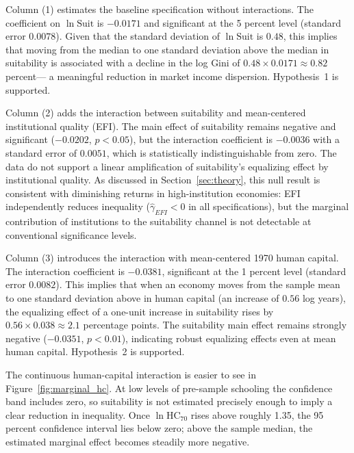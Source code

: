 \documentclass[12pt]{article}
\newcommand{\suit}{\mathrm{Suit}}
\newcommand{\hc}{\mathrm{HC}}
\begin{document}
Column (1) estimates the baseline specification without
interactions.
The coefficient on $\ln \suit$ is $-0.0171$ and significant at the
5 percent level (standard error $0.0078$).
Given that the standard deviation of $\ln \suit$ is $0.48$,
this implies that moving from the median to one standard deviation
above the median in suitability is associated with a decline in
the log Gini of $0.48 \times 0.0171 \approx 0.82$ percent---
a meaningful reduction in market income dispersion.
Hypothesis~1 is supported.

Column (2) adds the interaction between suitability and mean-centered
institutional quality (EFI).
The main effect of suitability remains negative and significant
($-0.0202$, $p < 0.05$), but the interaction coefficient is
$-0.0036$ with a standard error of $0.0051$, which is
statistically indistinguishable from zero.
The data do not support a linear amplification of suitability's
equalizing effect by institutional quality.
As discussed in Section~\ref{sec:theory}, this null result is
consistent with diminishing returns in high-institution economies:
EFI independently reduces inequality ($\hat{\gamma}_{EFI} < 0$
in all specifications), but the marginal contribution of institutions
to the suitability channel is not detectable at conventional
significance levels.

Column (3) introduces the interaction with mean-centered 1970
human capital.
The interaction coefficient is $-0.0381$, significant at the
1 percent level (standard error $0.0082$).
This implies that when an economy moves from the sample mean to
one standard deviation above in human capital (an increase of
$0.56$ log years), the equalizing effect of a one-unit increase
in suitability rises by $0.56 \times 0.038 \approx 2.1$ percentage
points.
The suitability main effect remains strongly negative ($-0.0351$,
$p < 0.01$), indicating robust equalizing effects even at mean
human capital.
Hypothesis~2 is supported.

The continuous human-capital interaction is easier to see in
Figure~\ref{fig:marginal_hc}.
At low levels of pre-sample schooling the confidence band includes
zero, so suitability is not estimated precisely enough to imply a
clear reduction in inequality.
Once $\ln \hc_{70}$ rises above roughly 1.35, the 95 percent
confidence interval lies below zero; above the sample median,
the estimated marginal effect becomes steadily more negative.
\end{document}
